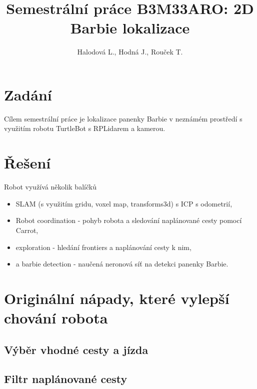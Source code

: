 \documentclass[twoside]{article}
\begin{document}
\author{Halodová L., Hodná J., Rouček T.}
\title{Semestrální práce B3M33ARO: 2D Barbie lokalizace}
\maketitle

\section{Zadání}
Cílem semestrální práce je lokalizace panenky Barbie v neznámém prostředí s využitím robotu TurtleBot s RPLidarem a kamerou.
\section{Řešení}
	Robot využívá několik balíčků
	\begin{itemize}
		\item SLAM (s využitím gridu, voxel map, transforms3d) s ICP s odometrií,
		\item Robot coordination - pohyb robota a sledování naplánované cesty pomocí Carrot,
		\item exploration - hledání frontiers a naplánování cesty k nim,
		\item a barbie detection - naučená neronová síť na detekci panenky Barbie.
	\end{itemize}
\section{Originální nápady, které vylepší chování robota}
\subsection{Výběr vhodné cesty a jízda}
\subsection{Filtr naplánované cesty}
\end{document}
